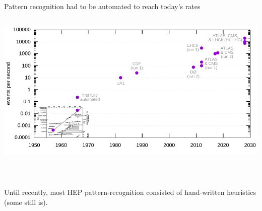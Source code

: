 \documentclass[aspectratio=169]{beamer}
\begin{document}
\begin{frame}{Pattern recognition had to be automated to reach today's rates}
\vspace{0.25 cm}
\begin{columns}
\includegraphics[width=\linewidth]{img/event-rates.pdf}
\end{columns}
\end{frame}

\begin{frame}{\mbox{ }}
\vspace{0.5 cm}
\Large

Until recently, most HEP pattern-recognition consisted of hand-written heuristics (some still is).

\vspace{1 cm}
\end{frame}
\end{document}
